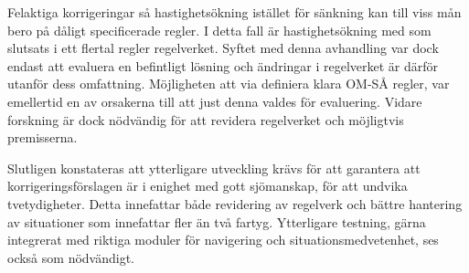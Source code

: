 Felaktiga korrigeringar så  hastighetsökning istället för sänkning kan till viss mån  bero på dåligt specificerade regler. I detta fall är hastighetsökning med som slutsats i ett flertal regler regelverket. Syftet med denna avhandling var dock endast att evaluera en befintligt lösning och ändringar i regelverket är därför utanför dess omfattning. Möjligheten att via definiera klara OM-SÅ regler, var emellertid en av orsakerna till att just denna valdes för evaluering.  Vidare forskning är dock  nödvändig för att revidera regelverket och möjligtvis premisserna. 

Slutligen konstateras att ytterligare utveckling krävs för att garantera att korrigeringsförslagen är i enighet med  gott sjömanskap, för att undvika tvetydigheter. Detta innefattar både revidering av regelverk och bättre hantering av situationer som innefattar fler än två fartyg. Ytterligare testning, gärna integrerat med riktiga moduler för navigering och situationsmedvetenhet, ses också som nödvändigt.